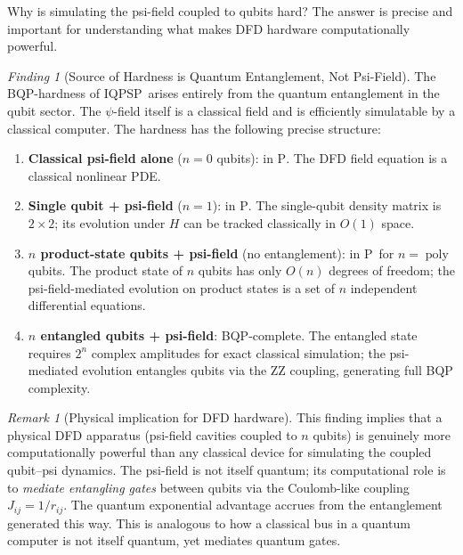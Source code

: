\documentclass[11pt]{article}
\theoremstyle{definition}
\theoremstyle{remark}
\newtheorem{remark}[theorem]{Remark}
\newtheorem{finding}[theorem]{Finding}
\newcommand{\PP}{\textsc{P}}
\newcommand{\IQPSP}{\textsc{IQPSP}}
\DeclareMathOperator{\poly}{poly}
\begin{document}
Why is simulating the psi-field coupled to qubits hard? The answer
is precise and important for understanding what makes DFD hardware
computationally powerful.

\begin{finding}[Source of Hardness is Quantum Entanglement, Not Psi-Field]
\label{find:hardness_source}
The BQP-hardness of \IQPSP\ arises entirely from the quantum entanglement
in the qubit sector. The $\psi$-field itself is a classical field and is
efficiently simulatable by a classical computer. The hardness has the
following precise structure:

\begin{enumerate}[label=(\roman*)]
\item \textbf{Classical psi-field alone} ($n = 0$ qubits): in \PP.
  The DFD field equation is a classical nonlinear PDE.

\item \textbf{Single qubit + psi-field} ($n = 1$): in \PP.
  The single-qubit density matrix is $2\times2$; its evolution under
  $H$ can be tracked classically in $O(1)$ space.

\item \textbf{$n$ product-state qubits + psi-field} (no entanglement):
  in \PP\ for $n = \poly$ qubits. The product state of $n$ qubits
  has only $O(n)$ degrees of freedom; the psi-field-mediated evolution
  on product states is a set of $n$ independent differential equations.

\item \textbf{$n$ entangled qubits + psi-field}: BQP-complete.
  The entangled state requires $2^n$ complex amplitudes for exact
  classical simulation; the psi-mediated evolution entangles qubits
  via the ZZ coupling, generating full BQP complexity.
\end{enumerate}
\end{finding}

\begin{remark}[Physical implication for DFD hardware]
This finding implies that a physical DFD apparatus (psi-field cavities
coupled to $n$ qubits) is genuinely more computationally powerful than
any classical device for simulating the coupled qubit--psi dynamics.
The psi-field is not itself quantum; its computational role is to
\emph{mediate entangling gates} between qubits via the Coulomb-like
coupling $J_{ij} = 1/r_{ij}$. The quantum exponential advantage accrues
from the entanglement generated this way. This is analogous to how a
classical bus in a quantum computer is not itself quantum, yet mediates
quantum gates.
\end{remark}
\end{document}
